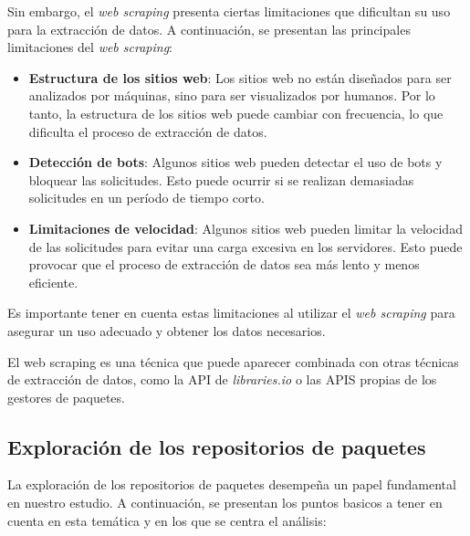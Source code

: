Sin embargo, el \textit{web scraping} presenta ciertas limitaciones que dificultan su uso
para la extracción de datos. A continuación, se presentan las principales limitaciones del
\textit{web scraping}:

\begin{itemize}
    \item \textbf{Estructura de los sitios web}: Los sitios web no están diseñados para
          ser analizados por máquinas, sino para ser visualizados por humanos. Por lo tanto,
          la estructura de los sitios web puede cambiar con frecuencia, lo que dificulta
          el proceso de extracción de datos.
    \item \textbf{Detección de bots}: Algunos sitios web pueden detectar el uso de bots
          y bloquear las solicitudes. Esto puede ocurrir si se realizan demasiadas solicitudes
          en un período de tiempo corto.
    \item \textbf{Limitaciones de velocidad}: Algunos sitios web pueden limitar la velocidad
          de las solicitudes para evitar una carga excesiva en los servidores. Esto puede
          provocar que el proceso de extracción de datos sea más lento y menos eficiente.
\end{itemize}

Es importante tener en cuenta estas limitaciones al utilizar el \textit{web scraping} para
asegurar un uso adecuado y obtener los datos necesarios.

El web scraping es una técnica que puede aparecer combinada con otras técnicas de extracción
de datos, como la API de \textit{libraries.io} o las APIS propias de los gestores de paquetes. 

\subsection{Exploración de los repositorios de paquetes}

La exploración de los repositorios de paquetes desempeña un papel fundamental en nuestro estudio.
A continuación, se presentan los puntos basicos a tener en cuenta en esta temática y en los que se
centra el análisis:


